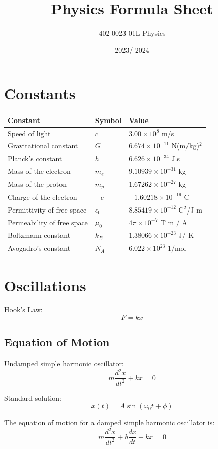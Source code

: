 \documentclass[12pt,a4paper]{article}
\title{Physics Formula Sheet}
\author{402-0023-01L  Physics}
\date{2023/ 2024}
\begin{document}
	\maketitle
	
	\section*{Constants}
	\begin{tabular}{lll}
		\toprule
		Constant & Symbol & Value \\
		\midrule
		Speed of light & \( c \) & \( 3.00 \times 10^8 \) m/s \\
		Gravitational constant & \( G \) & \( 6.674 \times 10^{-11} \) N(m/kg)\(^2\) \\
		Planck's constant & \( h \) & \( 6.626 \times 10^{-34} \) J.s \\
		Mass of the electron & \( m_e \) & \( 9.10939 \times 10^{-31} \) kg \\
		Mass of the proton & \( m_p \) & \( 1.67262 \times 10^{-27} \) kg \\
		Charge of the electron & \(-e\) & \(-1.60218 \times 10^{-19} \) C \\
		Permittivity of free space & \(\epsilon_0\) & \( 8.85419 \times 10^{-12} \) C\(^2\)/J m \\
		Permeability of free space & \(\mu_0\) & \( 4 \pi \times 10^{-7} \) T m / A \\
		Boltzmann constant & \( k_B \) & \( 1.38066 \times 10^{-23} \) J/ K \\
		Avogadro's constant & \( N_A \) & \( 6.022 \times 10^{23} \) 1/mol \\
		\bottomrule
	\end{tabular}
	
	\section*{Oscillations}
	Hook's Law: \[ F = k x \]
	\subsection*{Equation of Motion}
	Undamped simple harmonic oscillator:
	\[	m \frac{d^2 x}{dt^2} + kx = 0\]
	
	Standard solution: \[ x(t) = A \sin (\omega_0 t + \phi)\]
	
	The equation of motion for a damped simple harmonic oscillator is:
	\[
	m \frac{d^2 x}{dt^2} + b \frac{dx}{dt} + kx = 0
	\]
	
\end{document}
